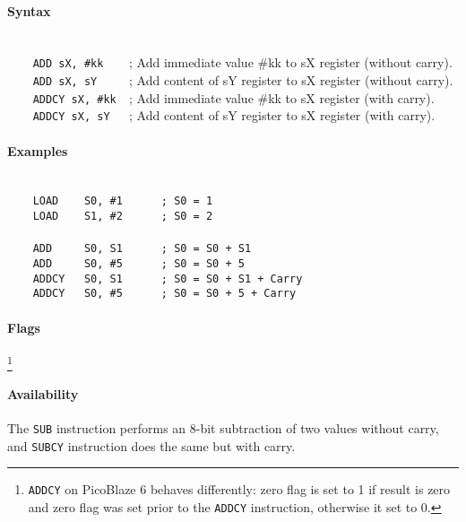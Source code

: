         \paragraph{Syntax}
            ~\\
            \verb'    ADD sX, #kk    '; Add immediate value \#kk to sX register (without carry).\\
            \verb'    ADD sX, sY     '; Add content of sY register to sX register (without carry).\\
            \verb'    ADDCY sX, #kk  '; Add immediate value \#kk to sX register (with carry).\\
            \verb'    ADDCY sX, sY   '; Add content of sY register to sX register (with carry).

        \paragraph{Examples}
            ~\\
            \verb'    LOAD    S0, #1      ; S0 = 1'\\
            \verb'    LOAD    S1, #2      ; S0 = 2'\\
            \verb''\\
            \verb'    ADD     S0, S1      ; S0 = S0 + S1'\\
            \verb'    ADD     S0, #5      ; S0 = S0 + 5'\\
            \verb'    ADDCY   S0, S1      ; S0 = S0 + S1 + Carry'\\
            \verb'    ADDCY   S0, #5      ; S0 = S0 + 5 + Carry'

        \paragraph{Flags}
            \footnote{\texttt{ADDCY} on PicoBlaze 6 behaves differently: zero flag is set to 1 if result is zero and zero flag was set prior to the \texttt{ADDCY} instruction, otherwise it set to 0.}

        \paragraph{Availability}
            \pbavailability{\yes}{\yes}{\yes}{\yes}{\yes}

    \clearpage
        The \texttt{SUB} instruction performs an 8-bit subtraction of two values without carry, and \texttt{SUBCY} instruction does the same but with carry.

